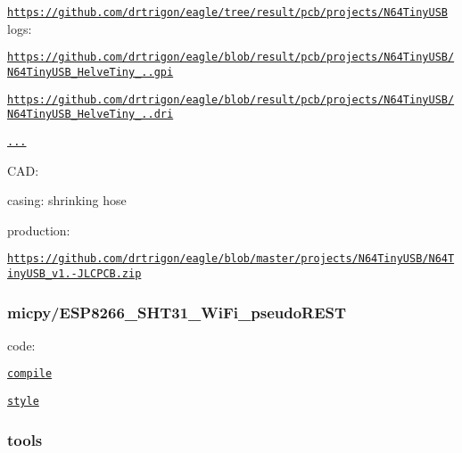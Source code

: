 \href{https://github.com/drtrigon/eagle/tree/result/pcb/projects/N64TinyUSB}{\tt https\-://github.\-com/drtrigon/eagle/tree/result/pcb/projects/\-N64\-Tiny\-U\-S\-B} logs\-:
\begin{DoxyItemize}
\item \href{https://github.com/drtrigon/eagle/blob/result/pcb/projects/N64TinyUSB/N64TinyUSB_HelveTiny_1.0.gpi}{\tt https\-://github.\-com/drtrigon/eagle/blob/result/pcb/projects/\-N64\-Tiny\-U\-S\-B/\-N64\-Tiny\-U\-S\-B\-\_\-\-Helve\-Tiny\-\_..\-gpi}
\item \href{https://github.com/drtrigon/eagle/blob/result/pcb/projects/N64TinyUSB/N64TinyUSB_HelveTiny_1.0.dri}{\tt https\-://github.\-com/drtrigon/eagle/blob/result/pcb/projects/\-N64\-Tiny\-U\-S\-B/\-N64\-Tiny\-U\-S\-B\-\_\-\-Helve\-Tiny\-\_..\-dri}
\end{DoxyItemize}

 \href{https://github.com/drtrigon/eagle/blob/result/pcb/projects/N64TinyUSB/N64TinyUSB_HelveTiny_1.0_auto.png}{\tt ...}

C\-A\-D\-:
\begin{DoxyItemize}
\item casing\-: shrinking hose
\end{DoxyItemize}

production\-:
\begin{DoxyItemize}
\item \href{https://github.com/drtrigon/eagle/blob/master/projects/N64TinyUSB/N64TinyUSB_v1.0-JLCPCB.zip}{\tt https\-://github.\-com/drtrigon/eagle/blob/master/projects/\-N64\-Tiny\-U\-S\-B/\-N64\-Tiny\-U\-S\-B\-\_\-v1.-\/\-J\-L\-C\-P\-C\-B.\-zip}
\end{DoxyItemize}

\subsubsection*{micpy/\-E\-S\-P8266\-\_\-\-S\-H\-T31\-\_\-\-Wi\-Fi\-\_\-pseudo\-R\-E\-S\-T}

code\-:
\begin{DoxyItemize}
\item \href{https://github.com/drtrigon/sketchbook/blob/result/docu/micpy/ESP8266_SHT31_WiFi_pseudoREST/*.py.compile}{\tt compile}
\item \href{https://github.com/drtrigon/sketchbook/blob/result/docu/micpy/ESP8266_SHT31_WiFi_pseudoREST/*.py.style}{\tt style}
\end{DoxyItemize}

\subsubsection*{tools}


